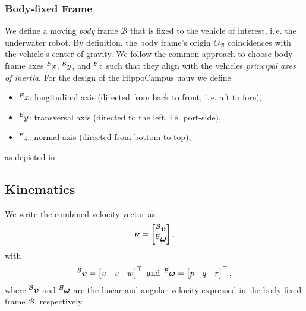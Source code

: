 \subsubsection{Body-fixed Frame}
We define a moving \textit{body} frame $\mathcal{B}$ that is fixed to the vehicle of interest, i.\,e. the underwater robot.
By definition, the body frame's origin ${O}_{\mathcal{B}}$ coincidences with the vehicle's center of gravity.%
We follow the common approach to choose body frame axes $\prescript{\mathcal{B}}{}{x}$, $\prescript{\mathcal{B}}{}{y}$, and $\prescript{\mathcal{B}}{}{z}$ such that they align with the vehicles \textit{principal axes of inertia}. 
For the design of the HippoCampus \ac{uauv} we define
\begin{itemize}
    \item $\prescript{\mathcal{B}}{}{x}$: longitudinal axis (directed from back to front, i.\,e. aft to fore),
    \item $\prescript{\mathcal{B}}{}{y}$: transversal axis (directed to the left, i.\.e. port-side),
    \item $\prescript{\mathcal{B}}{}{z}$: normal axis (directed from bottom to top),
\end{itemize}
as depicted in .


\subsection{Kinematics}

We write the combined velocity vector \nub as
\begin{equation}
	\mbox{$\bm{\nu}$} = 
	\begin{bmatrix}
		\prescript{\mathcal{B}}{}{\mbox{$\bm{v}$}} \\
		\prescript{\mathcal{B}}{}{\mbox{$\bm{\omega}$}}
	\end{bmatrix}
	,
\end{equation}
with 
\begin{equation}
	\label{eq:velocities-in-body-frame}
	\prescript{\mathcal{B}}{}{\mbox{$\bm{v}$}} = 
	\begin{bmatrix}
		u & v & w
	\end{bmatrix}^\top
	\text{ and }
	\prescript{\mathcal{B}}{}{\mbox{$\bm{\omega}$}} = 
	\begin{bmatrix}
		p & q & r
	\end{bmatrix}^\top
	,
\end{equation}
where $\prescript{\mathcal{B}}{}{\mbox{$\bm{v}$}}$ and $\prescript{\mathcal{B}}{}{\mbox{$\bm{\omega}$}}$ are the linear and angular velocity expressed in the body-fixed frame $\mathcal{B}$, respectively.

